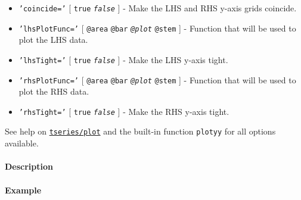\begin{itemize}
\item
  \texttt{'coincide='} {[} \texttt{true} \textbar{}
  \emph{\texttt{false}} {]} - Make the LHS and RHS y-axis grids
  coincide.
\item
  \texttt{'lhsPlotFunc='} {[} \texttt{@area} \textbar{} \texttt{@bar}
  \textbar{} \emph{\texttt{@plot}} \textbar{} \texttt{@stem} {]} -
  Function that will be used to plot the LHS data.
\item
  \texttt{'lhsTight='} {[} \texttt{true} \textbar{}
  \emph{\texttt{false}} {]} - Make the LHS y-axis tight.
\item
  \texttt{'rhsPlotFunc='} {[} \texttt{@area} \textbar{} \texttt{@bar}
  \textbar{} \emph{\texttt{@plot}} \textbar{} \texttt{@stem} {]} -
  Function that will be used to plot the RHS data.
\item
  \texttt{'rhsTight='} {[} \texttt{true} \textbar{}
  \emph{\texttt{false}} {]} - Make the RHS y-axis tight.
\end{itemize}

See help on \href{tseries/plot}{\texttt{tseries/plot}} and the built-in
function \texttt{plotyy} for all options available.

\paragraph{Description}\label{description}

\paragraph{Example}\label{example}


